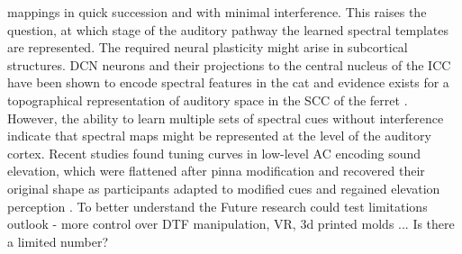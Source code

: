mappings in quick succession and with minimal interference. This raises the question, at which stage of the auditory pathway the learned spectral templates are represented. The required neural plasticity might arise in subcortical structures. DCN neurons and their projections to the central nucleus of the ICC have been shown to encode spectral features in the cat \citep{davis_auditory_2003} and evidence exists for a topographical representation of auditory space in the SCC of the ferret \citep{king_spatial_1987}. However, the ability to learn multiple sets of spectral cues without interference indicate that spectral maps might be represented at the level of the auditory cortex. Recent studies found tuning curves in low-level AC encoding sound elevation, which were flattened after pinna modification and recovered their original shape as participants adapted to modified cues and regained elevation perception \citep{trapeau_encoding_2018}. To better understand the 
Future research could test limitations  outlook - more control over DTF manipulation, VR, 3d printed molds ...
Is there a limited number? 


